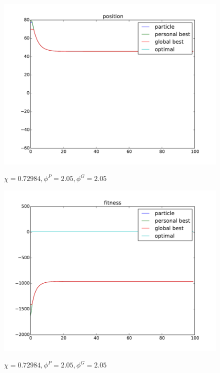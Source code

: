 \begin{figure}[ht]
\centering
\includegraphics[width=.7\linewidth]{./simfig/case2/position2-2} 
\label{fig:case2-2:position}
\caption{$ \chi = 0.72984 , \phi^{P} = 2.05 , \phi^{G} = 2.05 $ }
\end{figure}
  
\begin{figure}[ht]
\centering
\includegraphics[width=.7\linewidth]{./simfig/case2/fitness2-2} 
\label{fig:case2-2:fitness} 
\caption{$ \chi = 0.72984 , \phi^{P} = 2.05 , \phi^{G} = 2.05 $ }
\end{figure}

